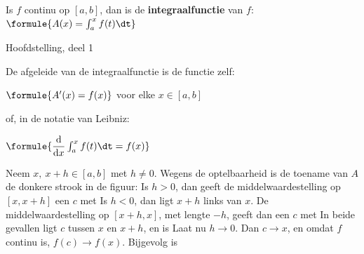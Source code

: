 \begin{theorie}
Is $f$ continu op $[a, b]$, dan is de \textbf{\textcolor{accent}{integraalfunctie}} van $f$: \quad $\formule{A(x) = \int_a^x f(t)\dt}$

\begin{stelling}{Hoofdstelling, deel 1}
\begin{minipage}[t]{.62\linewidth}
\vspace{0pt}
De afgeleide van de integraalfunctie is de functie zelf:

\vspace{1mm}
\qquad $\formule{A'(x) = f(x)}$ \quad voor elke $x \in [a, b]$

\vspace{1.5mm}
of, in de notatie van Leibniz:

\vspace{1mm}
\qquad $\formule{\dfrac{\mathrm{d}}{\mathrm{d}x} \int_a^x f(t)\dt = f(x)}$
\end{minipage}\hfill
\begin{minipage}[t]{.34\linewidth}
\vspace{0pt}
\end{minipage}
\end{stelling}

\begin{bewijs}
Neem $x,\ x + h \in [a, b]$ met $h \neq 0$. Wegens de optelbaarheid is de toename van $A$ de donkere strook in de figuur:
Is $h > 0$, dan geeft de middelwaardestelling op $[x, x + h]$ een $c$ met
Is $h < 0$, dan ligt $x + h$ links van $x$. De middelwaardestelling op $[x + h, x]$, met lengte $-h$, geeft dan een $c$ met
In beide gevallen ligt $c$ tussen $x$ en $x + h$, en is
Laat nu $h \to 0$. Dan $c \to x$, en omdat $f$ continu is, $f(c) \to f(x)$. Bijgevolg is
\end{bewijs}
\end{theorie}

